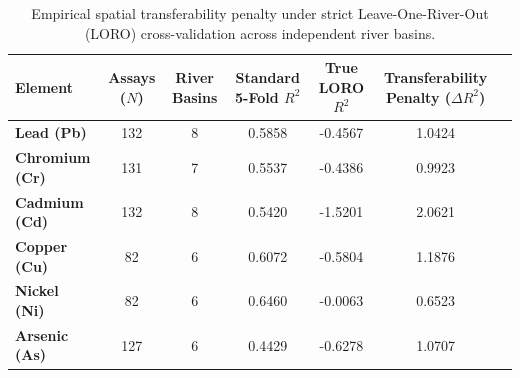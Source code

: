 \documentclass[authoryear,preprint,12pt]{elsarticle}
\begin{document}
\begin{table}[htbp]
\centering
\small
\caption{Empirical spatial transferability penalty under strict Leave-One-River-Out (LORO) cross-validation across independent river basins.}
\label{tab:loro}
\begin{tabular}{lcccccc}
\toprule
Element & Assays ($N$) & River Basins & Standard 5-Fold $R^2$ & True LORO $R^2$ & Transferability Penalty ($\Delta R^2$) \\
\midrule
\textbf{Lead (Pb)} & 132 & 8 & 0.5858 & -0.4567 & 1.0424 \\
\textbf{Chromium (Cr)} & 131 & 7 & 0.5537 & -0.4386 & 0.9923 \\
\textbf{Cadmium (Cd)} & 132 & 8 & 0.5420 & -1.5201 & 2.0621 \\
\textbf{Copper (Cu)} & 82 & 6 & 0.6072 & -0.5804 & 1.1876 \\
\textbf{Nickel (Ni)} & 82 & 6 & 0.6460 & -0.0063 & 0.6523 \\
\textbf{Arsenic (As)} & 127 & 6 & 0.4429 & -0.6278 & 1.0707 \\
\bottomrule
\end{tabular}
\end{table}
\end{document}
